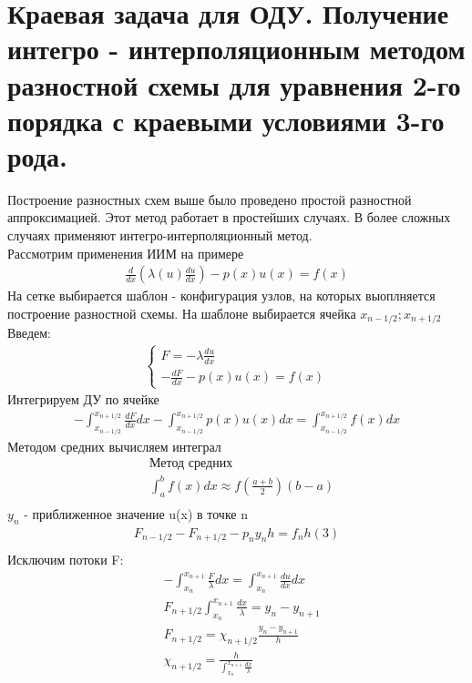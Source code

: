 \documentclass[12pt,a4paper]{article}
\begin{document}
	\section{Краевая задача для ОДУ. Получение интегро - интерполяционным методом разностной схемы для уравнения 2-го порядка с краевыми условиями 3-го рода.}
	Построение разностных схем выше было проведено простой разностной аппроксимацией. Этот метод работает в простейших случаях. В более сложных случаях применяют интегро-интерполяционный метод. \\
	Рассмотрим применения ИИМ на примере\\
	\begin{align*}
	\frac{d}{dx} (\lambda(u) \frac{du}{dx}) - p(x) u(x) = f(x)
	\end{align*}
	На сетке выбирается шаблон - конфигурация узлов, на которых выоплняется построение разностной схемы. На шаблоне выбирается ячейка $x_{n-1/2}; x_{n+1/2}$\\
	Введем:
	\begin{align*}
	\begin{cases}
	F = -\lambda \frac{du}{dx}\\
	-\frac{dF}{dx} - p(x)u(x) = f(x)
	\end{cases}
	\end{align*}
	Интегрируем ДУ по ячейке\\
	\begin{align*}
	-\int_{x_{n-1/2}}^{x_{n+1/2}} \frac{dF}{dx} dx - \int_{x_{n-1/2}}^{x_{n+1/2}} p(x) u(x) dx = \int_{x_{n-1/2}}^{x_{n+1/2}}f(x) dx
	\end{align*}	
	Методом средних вычисляем интеграл\\
	\begin{align*}
	&\text{Метод средних}\\
	&\int_{a}^{b} f(x) dx \approx f(\frac{a+b}{2})(b-a)\\
	\end{align*}
	$y_n$ - приближенное значение u(x) в точке n\\
	\begin{align*}
	F_{n-1/2} - F_{n+1/2} - p_n y_n h = f_n h (3)\\
	\end{align*}
	Исключим потоки F:\\
	\begin{align*}
	&-\int_{x_n}^{x_{n+1}} \frac{F}{\lambda} dx = \int_{x_n}^{x_{n+1}} \frac{du}{dx} dx\\
	&F_{n+1/2}\int_{x_n}^{x_{n+1}}\frac{dx}{\lambda}  = y_n - y_{n+1}\\
	&F_{n+1/2} = \chi_{n+1/2}\frac{y_n - y_{n+1}}{h}\\
	&\chi_{n+1/2} = \frac{h}{\int_{x_n}^{x_{n+1}}\frac{dx}{\lambda}}
	\end{align*}
\end{document}
